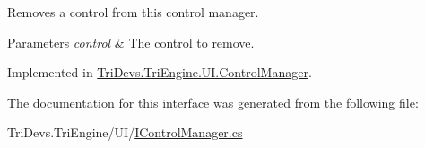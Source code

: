 Removes a control from this control manager. 


\begin{DoxyParams}{Parameters}
{\em control} & The control to remove.\\
\hline
\end{DoxyParams}


Implemented in \hyperlink{class_tri_devs_1_1_tri_engine_1_1_u_i_1_1_control_manager_a1ea14477960aee098283c0ac1f295e6f}{Tri\-Devs.\-Tri\-Engine.\-U\-I.\-Control\-Manager}.



The documentation for this interface was generated from the following file\-:\begin{DoxyCompactItemize}
\item 
Tri\-Devs.\-Tri\-Engine/\-U\-I/\hyperlink{_i_control_manager_8cs}{I\-Control\-Manager.\-cs}\end{DoxyCompactItemize}
